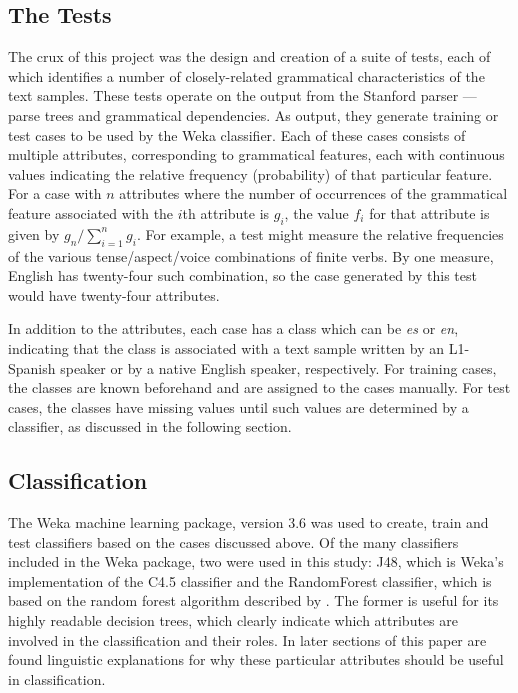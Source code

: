 \documentclass[main.tex]{subfiles}
\begin{document}
\subsection{The Tests}
The crux of this project was the design and creation of a suite of tests, each of which identifies a number of closely-related grammatical characteristics of the text samples. These tests operate on the output from the Stanford parser --- parse trees and grammatical dependencies. As output, they generate training or test cases to be used by the Weka classifier. Each of these cases consists of multiple attributes, corresponding to grammatical features, each with continuous values indicating the relative frequency (probability) of that particular feature. For a case with $n$ attributes where the number of occurrences of the grammatical feature associated with the $i$th attribute is $g_i$, the value $f_i$ for that attribute is given by $g_n  / \displaystyle\sum\limits_{i=1}^n g_i$. For example, a test might measure the relative frequencies of the various tense/aspect/voice combinations of finite verbs. By one measure, English has twenty-four such combination, so the case generated by this test would have twenty-four attributes.

In addition to the attributes, each case has a class which can be \textit{es} or \textit{en}, indicating that the class is associated with a text sample written by an L1-Spanish speaker or by a native English speaker, respectively. For training cases, the classes are known beforehand and are assigned to the cases manually. For test cases, the classes have missing values until such values are determined by a classifier, as discussed in the following section.

\subsection{Classification}

The Weka machine learning package, version 3.6 \citep{hall-et-al:2009} was used to create, train and test classifiers based on the cases discussed above. Of the many classifiers included in the Weka package, two were used in this study: J48, which is Weka's implementation of the C4.5 classifier \citep{quinlan:1993} and the RandomForest classifier, which is based on the random forest algorithm described by \citet{breiman:2001}. The former is useful for its highly readable decision trees, which clearly indicate which attributes are involved in the classification and their roles. In later sections of this paper are found linguistic explanations for why these particular attributes should be useful in classification.
 
\end{document}
